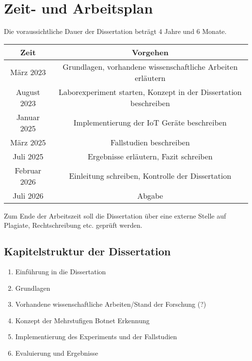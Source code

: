 \section{Zeit- und Arbeitsplan}

Die voraussichtliche Dauer der Dissertation beträgt 4 Jahre und 6 Monate.

\begin{center}
    \begin{tabular}[c]{| c | c |}
        \hline
        \rowcolor{lightgray} Zeit & Vorgehen \\ [0.5ex]
        \hline
        März 2023 & Grundlagen, vorhandene wissenschaftliche Arbeiten erläutern \\
        \hline
        August 2023 &  Laborexperiment starten, Konzept in der Dissertation beschreiben \\
        \hline
        Januar 2025 & Implementierung der IoT Geräte beschreiben \\
        \hline
        März 2025 & Fallstudien beschreiben \\
        \hline
        Juli 2025 & Ergebnisse erläutern, Fazit schreiben \\
        \hline
        Februar 2026 & Einleitung schreiben, Kontrolle der Dissertation \\
        \hline
        Juli 2026 & Abgabe \\
        \hline
    \end{tabular}
\end{center}

Zum Ende der Arbeitszeit soll die Dissertation über eine externe Stelle auf Plagiate, Rechtschreibung etc.
geprüft werden.

\subsection*{Kapitelstruktur der Dissertation}

\begin{enumerate}[label=\Roman*]
    \item Einführung in die Dissertation
    \item Grundlagen
    \item Vorhandene wissenschaftliche Arbeiten/Stand der Forschung (?)
    \item Konzept der Mehrstufigen Botnet Erkennung
    \item Implementierung des Experiments und der Fallstudien
    \item Evaluierung und Ergebnisse
\end{enumerate}
